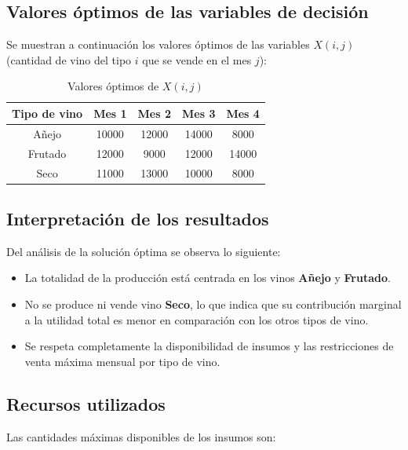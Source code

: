 \documentclass[12pt, a4paper, oneside]{book}
\theoremstyle{definition}
\begin{document}
    \subsection{Valores óptimos de las variables de decisión}

    Se muestran a continuación los valores óptimos de las variables $X(i,j)$ (cantidad de vino del tipo $i$ que se vende en el mes $j$):

    \begin{table}
    \centering
    \caption{Valores óptimos de $X(i,j)$}
    \begin{tabular}{|c|c|c|c|c|}
    \hline
    \textbf{Tipo de vino} & \textbf{Mes 1} & \textbf{Mes 2} & \textbf{Mes 3} & \textbf{Mes 4} \\
    \hline
    Añejo   & 10000 & 12000 & 14000 & 8000 \\
    Frutado & 12000 & 9000 & 12000 & 14000 \\
    Seco    & 11000    & 13000    & 10000    & 8000 \\
    \hline
    \end{tabular}
    \end{table}

    \subsection{Interpretación de los resultados}

    Del análisis de la solución óptima se observa lo siguiente:

    \begin{itemize}
        \item La totalidad de la producción está centrada en los vinos \textbf{Añejo} y \textbf{Frutado}.
        \item No se produce ni vende vino \textbf{Seco}, lo que indica que su contribución marginal a la utilidad total es menor en comparación con los otros tipos de vino.
        \item Se respeta completamente la disponibilidad de insumos y las restricciones de venta máxima mensual por tipo de vino.
    \end{itemize}

    \subsection{Recursos utilizados}

    Las cantidades máximas disponibles de los insumos son:
\end{document}
